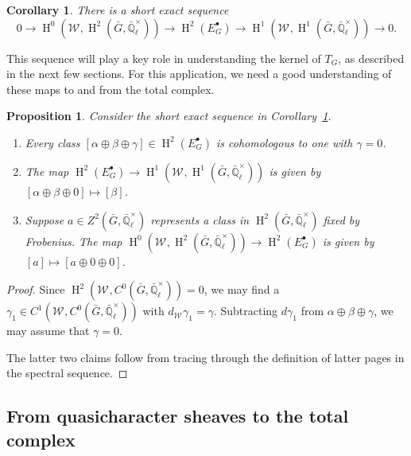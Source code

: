 \documentclass[CM,Submssn,SecEq]{degruyter-crelle} %
\theoremstyle{plain}
\newtheorem{proposition}[theorem]{Proposition}
\newtheorem{corollary}[theorem]{Corollary}
\theoremstyle{definition}
\theoremstyle{remark}
\newcommand{\EE}{\mathbb{\bar Q}_\ell}
\newcommand{\EEx}{\EE^\times}
\newcommand{\Weil}[1]{\mathcal{W}_{#1}}
\DeclareMathOperator{\Hh}{H}
\newcommand{\TrFrob}[1]{T_{#1}}
\begin{document}
\begin{corollary}\label{cor:spectral_ses}
There is a short exact sequence
 \[
    0 \to
    \Hh^0(\Weil{},\Hh^2({\bar G},\EEx)) \to
    \Hh^2(E^\bullet_G) \to
    \Hh^1(\Weil{},\Hh^1({\bar G},\EEx)) \to
    0.
 \]
\end{corollary}

This sequence will play a key role in understanding the kernel of $\TrFrob{G}$, as described in the next few sections.
For this application, we need a good understanding of these maps to and from the total complex.

\begin{proposition} \label{prop:ses_desc}
Consider the short exact sequence in Corollary~\ref{cor:spectral_ses}.
\begin{enumerate}
\item Every class $[\alpha\oplus\beta\oplus\gamma] \in \Hh^2(E^\bullet_G)$ is cohomologous to one with $\gamma=0$.
\item The map $\Hh^2(E^\bullet_G) \to \Hh^1(\Weil{},\Hh^1({\bar G},\EEx))$ is given by $[\alpha\oplus\beta\oplus 0] \mapsto [\beta]$.
\item Suppose $a \in Z^2({\bar G}, \EEx)$ represents a class in $\Hh^2({\bar G},\EEx)$ fixed by Frobenius.
The map $\Hh^0(\Weil{},\Hh^2({\bar G},\EEx)) \to \Hh^2(E^\bullet_G)$ is given by $[a] \mapsto [a \oplus 0 \oplus 0]$.
\end{enumerate}
\end{proposition}
\begin{proof}
Since $\Hh^2(\Weil{}, C^0({\bar G}, \EEx)) = 0$, we may find a $\gamma_1 \in C^1(\Weil{}, C^0({\bar G}, \EEx))$ with $d_{\Weil{}}\gamma_1 = \gamma$.
Subtracting $d \gamma_1$ from $\alpha\oplus\beta\oplus\gamma$, we may assume that $\gamma = 0$.

The latter two claims follow from tracing through the definition of latter pages in the spectral sequence.
\end{proof}

\subsection{From quasicharacter sheaves to the total complex}\label{ssec:S}
\end{document}
